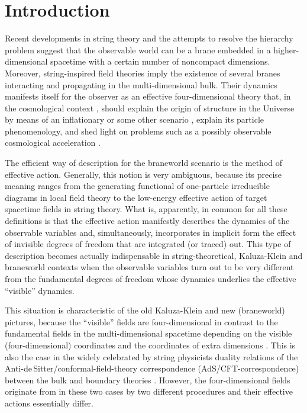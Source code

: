 \documentclass[a4paper,preprint,nofootinbib,
                 showpacs,preprintnumbers,amsmath,amssymb]{revtex4}
\begin{document}
\section{Introduction\label{intro}} 
Recent developments in string theory 
\cite{string} and the attempts to resolve the hierarchy problem 
\cite{hierarchy} suggest that the observable world can be a brane 
embedded in a higher-dimensional spacetime with a certain number 
of noncompact dimensions. Moreover, string-inspired field theories 
imply the existence of several branes interacting and propagating 
in the multi-dimensional bulk. Their dynamics manifests itself for 
the observer as an effective four-dimensional theory that, in the 
cosmological context \cite{BDL,ShiMaSa}, should explain the origin 
of structure in the Universe by means of an inflationary or some 
other scenario \cite{Ekpyr,Pyr}, explain its particle 
phenomenology, and shed light on problems such as a possibly 
observable cosmological acceleration \cite{accel}. 
 
The efficient way of description for the braneworld scenario is 
the method of effective action. Generally, this notion is very 
ambiguous, because its precise meaning ranges from the generating 
functional of one-particle irreducible diagrams in local field 
theory to the low-energy effective action of target spacetime 
fields in string theory. What is, apparently, in common for all 
these definitions is that the effective action manifestly describes 
the dynamics of the observable variables and, simultaneously, 
incorporates in implicit form the effect of invisible degrees of 
freedom that are integrated (or traced) out. This type of 
description becomes actually indispensable in string-theoretical, 
Kaluza-Klein and braneworld contexts when the observable variables 
turn out to be very different from the fundamental degrees of 
freedom whose dynamics underlies the effective ``visible'' 
dynamics. 
 
This situation is characteristic of the old Kaluza-Klein and new (braneworld) 
pictures, because the ``visible'' fields \coordHE{} are four-dimensional in 
contrast to the fundamental fields \coordHE{} in the multi-dimensional 
spacetime depending on the visible (four-dimensional) coordinates \coordHE{} and the 
coordinates of extra dimensions \coordHE{}. This is also the case in the widely 
celebrated by string physicists duality relations of the  
Anti-de\,Sitter/conformal-field-theory correspondence 
(AdS/CFT-correspondence) between the bulk and boundary theories  
\cite{AdS/CFT}. However, the four-dimensional fields \coordHE{}  
originate from \coordHE{} in these two cases by two different  
procedures and their effective actions essentially differ. 
 
\end{document}
